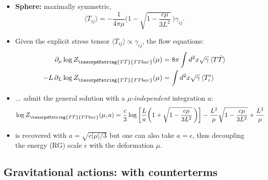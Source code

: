\documentclass[10pt]{article}
\newcommand{\citations}[1]{{\footnotesize#1\par}}
\newcommand{\TTbar}{\texorpdfstring{\ensuremath{T\bar{T}}}{TTbar}\xspace}
\begin{document}
\begin{multicols}{3}
\begin{itemize}
\item \textbf{Sphere:} maximally symmetric, \mbox{\footnotesize \textcite{Donnelly:2018bef}}
	\begin{equation}
		\langle T_{ij}\rangle =-\frac{1}{4\pi\mu} \bigg(1-\sqrt{1-\frac{c\mu}{3L^2}}\, \bigg)  \gamma_{ij}.
	\end{equation}
\end{itemize}

\citations{\textcite{Donnelly:2018bef,Li:2020zjb}}

\begin{itemize}

\item Given the explicit stress tensor $\langle T_{ij}\rangle \propto \gamma_{ij}$, the flow equations:
	\begin{align*}
\partial_\mu \log Z_{\TTbar}(\mu)&=8\pi \int d^2x\sqrt{\gamma}\, \langle T\bar{T} \rangle \\
-L\,\partial_L \log Z_{\TTbar}(\mu)&=\int d^2x\sqrt{\gamma}\,\langle T^i_i \rangle
	\end{align*}

	\item ... admit the general solution with a $\mu$-\textit{independent} integration $a$:
	\begin{equation*}
		\log Z_{\TTbar}(\mu, a) = \frac{c}{3} \log \bigg[\frac{L}{a}   \bigg(1+\sqrt{1-\frac{c \mu }{3  L^2}}\, \bigg) \bigg] - \frac{L^2}{\mu}  \sqrt{1-\frac{c \mu }{3 L^2}} + \frac{L^2}{\mu} %
	\end{equation*}

	\item \textcite{Donnelly:2018bef} is recovered with $a = \sqrt{c|\mu|/3}$ but one can also take $a = \epsilon$, thus decoupling the energy (RG) scale $\epsilon$ with the deformation $\mu$. 
\end{itemize}

\subsection*{Gravitational actions: with counterterms}

\textcite{Donnelly:2018bef,Caputa:2020lpa,Li:2020zjb}

\begin{itemize}


\end{itemize}
\end{multicols}
\end{document}
